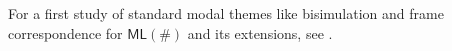 \documentclass[12pt,oneside,reqno]{amsart}
\theoremstyle{definition}
\newtheorem{remark}{Remark}
\begin{document}
For a first study of standard modal themes like bisimulation and frame correspondence for $\mathsf{ML}(\#)$ and its  extensions, see \cite{FuZh23b}.




 




\end{document}
